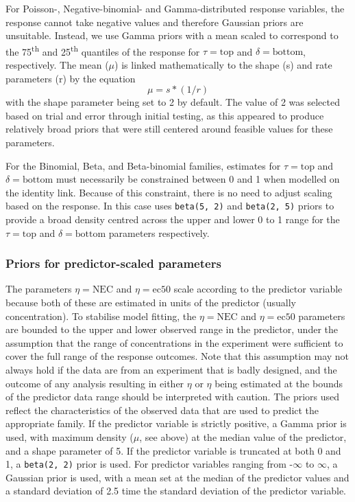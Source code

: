 \documentclass[
  shortnames]{jss}
\begin{document}
For Poisson-, Negative-binomial- and Gamma-distributed response variables, the response cannot take negative values and therefore Gaussian priors are unsuitable. Instead, we use Gamma priors with a mean scaled to correspond to the 75\textsuperscript{th} and 25\textsuperscript{th} quantiles of the response for \(\tau = \text{top}\) and \(\delta = \text{bottom}\), respectively. The mean (\(\mu\)) is linked mathematically to the shape (s) and rate parameters (r) by the equation \[ \mu = s * (1/r) \] \citep{Becker1988} with the shape parameter being set to 2 by default. The value of 2 was selected based on trial and error through initial testing, as this appeared to produce relatively broad priors that were still centered around feasible values for these parameters.

For the Binomial, Beta, and Beta-binomial families, estimates for \(\tau = \text{top}\) and \(\delta = \text{bottom}\) must necessarily be constrained between 0 and 1 when modelled on the identity link. Because of this constraint, there is no need to adjust scaling based on the response. In this case  uses \texttt{beta(5,\ 2)} and \texttt{beta(2,\ 5)} priors to provide a broad density centred across the upper and lower 0 to 1 range for the \(\tau = \text{top}\) and \(\delta = \text{bottom}\) parameters respectively.

\hypertarget{priors-for-predictor-scaled-parameters}{%
\subsubsection{Priors for predictor-scaled parameters}\label{priors-for-predictor-scaled-parameters}}

The parameters \(\eta = \text{NEC}\) and \(\eta = \text{ec50}\) scale according to the predictor variable because both of these are estimated in units of the predictor (usually concentration). To stabilise model fitting, the \(\eta = \text{NEC}\) and \(\eta = \text{ec50}\) parameters are bounded to the upper and lower observed range in the predictor, under the assumption that the range of concentrations in the experiment were sufficient to cover the full range of the response outcomes. Note that this assumption may not always hold if the data are from an experiment that is badly designed, and the outcome of any analysis resulting in either \(\eta\) or \(\eta\) being estimated at the bounds of the predictor data range should be interpreted with caution. The priors used reflect the characteristics of the observed data that are used to predict the appropriate family. If the predictor variable is strictly positive, a Gamma prior is used, with maximum density (\(\mu\), see above) at the median value of the predictor, and a shape parameter of 5. If the predictor variable is truncated at both 0 and 1, a \texttt{beta(2,\ 2)} prior is used. For predictor variables ranging from -\(\infty\) to \(\infty\), a Gaussian prior is used, with a mean set at the median of the predictor values and a standard deviation of 2.5 time the standard deviation of the predictor variable.
\end{document}
